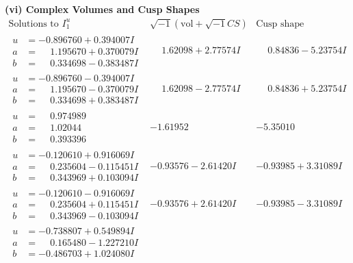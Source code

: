 \documentclass[1p]{elsarticle_modified}
\theoremstyle{definition}
\newcommand{\I}{\sqrt{-1}}
\begin{document}
\newpage\flushleft \textbf{(vi) Complex Volumes and Cusp Shapes}
$$\begin{array}{c|c|c}  
\text{Solutions to }I^u_{1}& \I (\text{vol} + \sqrt{-1}CS) & \text{Cusp shape}\\
 \hline 
\begin{aligned}
u &= -0.896760 + 0.394007 I \\
a &= \phantom{-}1.195670 + 0.370079 I \\
b &= \phantom{-}0.334698 - 0.383487 I\end{aligned}
 & \phantom{-}1.62098 + 2.77574 I & \phantom{-}0.84836 - 5.23754 I \\ \hline\begin{aligned}
u &= -0.896760 - 0.394007 I \\
a &= \phantom{-}1.195670 - 0.370079 I \\
b &= \phantom{-}0.334698 + 0.383487 I\end{aligned}
 & \phantom{-}1.62098 - 2.77574 I & \phantom{-}0.84836 + 5.23754 I \\ \hline\begin{aligned}
u &= \phantom{-}0.974989\phantom{ +0.000000I} \\
a &= \phantom{-}1.02044\phantom{ +0.000000I} \\
b &= \phantom{-}0.393396\phantom{ +0.000000I}\end{aligned}
 & -1.61952\phantom{ +0.000000I} & -5.35010\phantom{ +0.000000I} \\ \hline\begin{aligned}
u &= -0.120610 + 0.916069 I \\
a &= \phantom{-}0.235604 - 0.115451 I \\
b &= \phantom{-}0.343969 + 0.103094 I\end{aligned}
 & -0.93576 - 2.61420 I & -0.93985 + 3.31089 I \\ \hline\begin{aligned}
u &= -0.120610 - 0.916069 I \\
a &= \phantom{-}0.235604 + 0.115451 I \\
b &= \phantom{-}0.343969 - 0.103094 I\end{aligned}
 & -0.93576 + 2.61420 I & -0.93985 - 3.31089 I \\ \hline\begin{aligned}
u &= -0.738807 + 0.549894 I \\
a &= \phantom{-}0.165480 - 1.227210 I \\
b &= -0.486703 + 1.024080 I\end{aligned}

\end{array}$$
\end{document}
